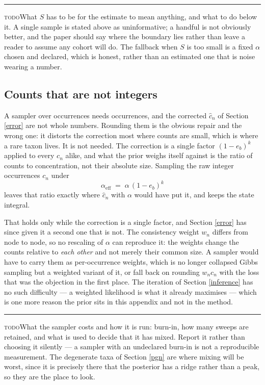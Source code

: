 \documentclass[pdflatex,sn-vancouver-num]{sn-jnl}
\newif\ifshowtodos \showtodostrue
\newcommand{\todo}[1]{%
  \ifshowtodos
    \par\addvspace{0.7\baselineskip}%
    \begin{list}{}{%
      \setlength{\leftmargin}{1.5em}%
      \setlength{\rightmargin}{1.5em}%
      \setlength{\topsep}{0pt}%
      \setlength{\partopsep}{0pt}%
      \setlength{\parsep}{0.5\baselineskip}%
      \setlength{\itemsep}{0pt}%
    }%
    \item[]\footnotesize\color{black!70}%
      \textcolor{orange!65!black}{\rule[-0.2ex]{2pt}{1.15ex}}\hspace{0.55em}%
      \textcolor{orange!65!black}{\textsc{todo}}\hspace{0.6em}\ignorespaces#1%
    \end{list}%
    \addvspace{0.7\baselineskip}%
  \fi%
}
\begin{document}
\begin{appendices}
    \todo{What $S$ has to be for the estimate to mean anything, and what to do below it. A single
    sample is stated above as uninformative; a handful is not obviously better, and the paper should
    say where the boundary lies rather than leave a reader to assume any cohort will do. The
    fallback when $S$ is too small is a fixed $\alpha$ chosen and declared, which is honest, rather
    than an estimated one that is noise wearing a number.}

    \subsection{Counts that are not integers}\label{integers}
    A sampler over occurrences needs occurrences, and the
    corrected $\hat{c}_n$ of Section \ref{error} are not whole numbers. Rounding them is the obvious
    repair and the wrong one: it distorts the correction most where counts are small, which is where
    a rare taxon lives. It is not needed. The correction is a single factor $(1 - e_b)^k$ applied to
    every $c_n$ alike, and what the prior weighs itself against is the ratio of counts to
    concentration, not their absolute size. Sampling the raw integer occurrences $c_n$ under
    \begin{equation}\label{smoothyalphaeff}
        \alpha_{\mathrm{eff}} \;=\; \alpha \, (1 - e_b)^k
    \end{equation}
    leaves that ratio exactly where $\hat{c}_n$ with $\alpha$ would have put it, and keeps the state
    integral.

    That holds only while the correction is a single factor, and Section \ref{error} has since given
    it a second one that is not. The consistency weight $w_n$ differs from node to node, so no
    rescaling of $\alpha$ can reproduce it: the weights change the counts relative to \emph{each
    other} and not merely their common size. A sampler would have to carry them as per-occurrence
    weights, which is no longer collapsed Gibbs sampling but a weighted variant of it, or fall back on
    rounding $w_n c_n$ with the loss that was the objection in the first place. The iteration of
    Section \ref{inference} has no such difficulty --- a weighted likelihood is what it already
    maximises --- which is one more reason the prior sits in this appendix and not in the method.

    \todo{What the sampler costs and how it is run: burn-in, how many sweeps are retained, and what
    is used to decide that it has mixed. Report it rather than choosing it silently --- a sampler with
    an undeclared burn-in is not a reproducible measurement. The degenerate taxa of
    Section \ref{pgn} are where mixing will be worst, since it is precisely there that the posterior
    has a ridge rather than a peak, so they are the place to look.}


\end{appendices}
\end{document}
